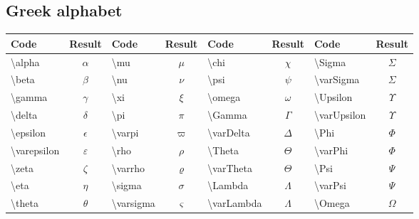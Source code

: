 \subsection{Greek alphabet}

\begin{center}
\begin{tabular}{|l|c||l|c|l|c||l|c|} \hline
Code                        & Result            & Code                        & Result      & Code                        & Result          & Code                        & Result          \\ \hline \hline
\textbackslash alpha        & $\alpha$          & \textbackslash mu           & $\mu$       & \textbackslash chi          & $\chi$          & \textbackslash Sigma        & $\Sigma$        \\ \hline
\textbackslash beta         & $\beta$           & \textbackslash nu           & $\nu$       & \textbackslash psi          & $\psi$          & \textbackslash varSigma     & $\varSigma$     \\ \hline
\textbackslash gamma        & $\gamma$          & \textbackslash xi           & $\xi$       & \textbackslash omega        & $\omega$        & \textbackslash Upsilon      & $\Upsilon$      \\ \hline
\textbackslash delta        & $\delta$          & \textbackslash pi           & $\pi$       & \textbackslash Gamma        & $\Gamma$        & \textbackslash varUpsilon   & $\varUpsilon$   \\ \hline
\textbackslash epsilon      & $\epsilon$        & \textbackslash varpi        & $\varpi$    & \textbackslash varDelta     & $\varDelta$     & \textbackslash Phi          & $\Phi$          \\ \hline
\textbackslash varepsilon   & $\varepsilon$     & \textbackslash rho          & $\rho$      & \textbackslash Theta        & $\Theta$        & \textbackslash varPhi       & $\varPhi$       \\ \hline
\textbackslash zeta         & $\zeta$           & \textbackslash varrho       & $\varrho$   & \textbackslash varTheta     & $\varTheta$     & \textbackslash Psi          & $\Psi$          \\ \hline
\textbackslash eta          & $\eta$            & \textbackslash sigma        & $\sigma$    & \textbackslash Lambda       & $\Lambda$       & \textbackslash varPsi       & $\varPsi$       \\ \hline
\textbackslash theta        & $\theta$          & \textbackslash varsigma     & $\varsigma$ & \textbackslash varLambda    & $\varLambda$    & \textbackslash Omega        & $\Omega$        \\ \hline

\end{tabular}
\end{center}
